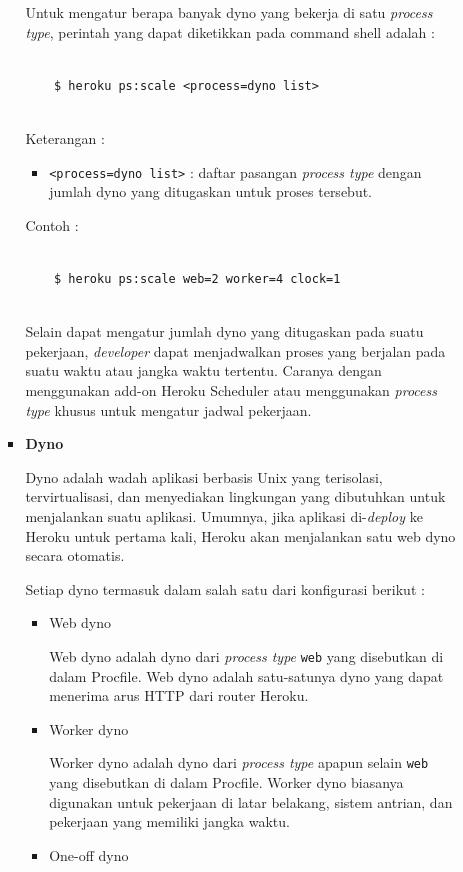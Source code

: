 \documentclass[a4paper,twoside]{article}
\begin{document}
\begin{enumerate}
\begin{enumerate}
\begin{itemize}
Untuk mengatur berapa banyak dyno yang bekerja di satu \textit{process type}, perintah yang dapat diketikkan pada command shell adalah :
\begin{lstlisting}

	$ heroku ps:scale <process=dyno list>
	
\end{lstlisting}
Keterangan :
\begin{itemize}
\item \texttt{<process=dyno list>} : daftar pasangan \textit{process type} dengan jumlah dyno yang ditugaskan untuk proses tersebut.
\end{itemize}

Contoh : 
\begin{lstlisting}

	$ heroku ps:scale web=2 worker=4 clock=1
	
\end{lstlisting}

Selain dapat mengatur jumlah dyno yang ditugaskan pada suatu pekerjaan, \textit{developer} dapat menjadwalkan proses yang berjalan pada suatu waktu atau jangka waktu tertentu. Caranya dengan menggunakan add-on Heroku Scheduler atau menggunakan \textit{process type} khusus untuk mengatur jadwal pekerjaan.
		
				\item \textbf{Dyno}
		
				Dyno adalah wadah aplikasi berbasis Unix yang terisolasi, tervirtualisasi, dan menyediakan lingkungan yang dibutuhkan untuk menjalankan suatu aplikasi. Umumnya, jika aplikasi di-\textit{deploy} ke Heroku untuk pertama kali, Heroku akan menjalankan satu web dyno secara otomatis.

Setiap dyno termasuk dalam salah satu dari konfigurasi berikut :
\begin{itemize}
\item Web dyno

Web dyno adalah dyno dari \textit{process type} \texttt{web} yang disebutkan di dalam Procfile. Web dyno adalah satu-satunya dyno yang dapat menerima arus HTTP dari router Heroku.

\item Worker dyno

Worker dyno adalah dyno dari \textit{process type} apapun selain \texttt{web} yang disebutkan di dalam Procfile. Worker dyno biasanya digunakan untuk pekerjaan di latar belakang, sistem antrian, dan pekerjaan yang memiliki jangka waktu.

\item One-off dyno


\end{itemize}
\end{itemize}
\end{enumerate}
\end{enumerate}
\end{document}
